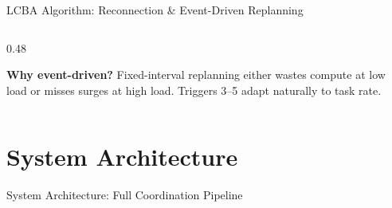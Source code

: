 \documentclass[aspectratio=169, 11pt]{beamer}
\newenvironment{tightenum}{\begin{enumerate}}{\end{enumerate}}
\newcommand{\Na}{N_a}
\begin{document}
\begin{frame}{LCBA Algorithm: Reconnection \& Event-Driven Replanning}
\begin{columns}[T]
    \begin{column}{0.48\textwidth}
    \vspace{-15pt}
      \vspace{-5pt}
      \begin{infobox}[top=4pt, bottom=4pt]
        \textbf{Why event-driven?} Fixed-interval replanning either
        wastes compute at low load or misses surges at high load.
        Triggers 3--5 adapt naturally to task rate.
      \end{infobox}
    \end{column}
  \end{columns}
\end{frame}

\section{System Architecture}

\begin{frame}{System Architecture: Full Coordination Pipeline}
  \centering
  \vspace{2pt}
  \resizebox{0.99\linewidth}{!}{%
  }
\end{frame}
\end{document}
